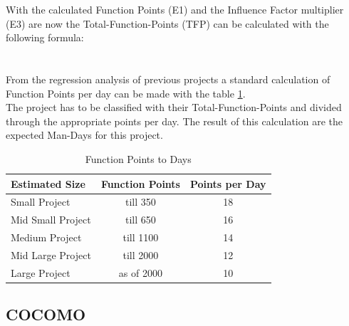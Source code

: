 With the calculated Function Points (E1) and the Influence Factor multiplier (E3) are now the Total-Function-Points (TFP) can be calculated with the following formula:\\
\\
\\
From the regression analysis of previous projects a standard calculation of Function Points per day can be made with the table \ref{tab:pointsperday}.\\
The project has to be classified with their Total-Function-Points and divided through the appropriate points per day. The result of this calculation are the expected Man-Days for this project.\\
\begin{table}[h] 
	\centering 
	\setlength{\tabcolsep}{4pt}
	\begin{tabular}{|l||c|c|}\hline
		Estimated Size    & Function Points & Points per Day\\ \hline\hline
		Small Project     & till 350        & 18 \\ \hline
		Mid Small Project & till 650        & 16 \\ \hline
		Medium Project    & till 1100 		& 14 \\ \hline
		Mid Large Project & till 2000 		& 12\\ \hline
		Large Project     & as of 2000 		& 10 \\ \hline
	\end{tabular}
	\caption{Function Points to Days} 
	\label{tab:pointsperday} 
\end{table} 

\subsection{COCOMO} \label{COCOMOMethod}


